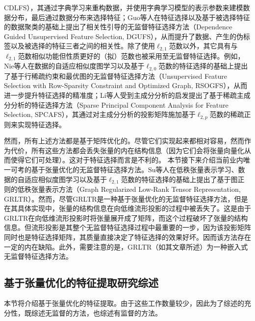 CDLFS），其通过字典学习来重构数据，并使用字典学习模型的表示参数来建模数据分布，最后通过数据分布来选择特征；Guo等人在特征选择以及基于被选择特征的数据聚类的基础上提出了相关性引导的无监督特征选择方法（Dependence Guided Unsupervised Feature Selection, DGUFS），从而提升了数据、产生的伪标签以及被选择的特征三者之间的相关性。除了使用$\ell_{2,1}$范数以外，其它具有与$\ell_{2,1}$范数相似功能但性质更好的（拟）范数也被采用至无监督特征选择。例如，Nie等人在数据的自适应相似度图学习以及基于$\ell_{2,0}$范数的特征选择的基础上提出了基于行稀疏约束和最优图的无监督特征选择方法（Unsupervised Feature Selection with Row-Sparsity Constraint and Optimized Graph, RSOGFS），从而进一步提升特征选择的精准度；Li等人受到主成分分析的启发提出了基于稀疏主成分分析的特征选择方法（Sparse Principal Component Analysis for Feature Selection, SPCAFS），其通过对主成分分析的投影矩阵施加基于$\ell_{2,p}$范数的稀疏正则来实现特征选择。

然而，所有上述方法都是基于矩阵优化的。尽管它们实现起来都相对容易，然而作为代价，所有这些方法都会丢失张量的内在结构信息（因为它们会将张量向量化从而使得它们可处理）。这对于特征选择而言是不利的。
本节接下来介绍当前业内唯一可考的基于张量优化的无监督特征选择方法。Su等人在低秩张量表示学习、数据的自适应相似度图学习以及基于$\ell_{2,1}$范数的特征选择的基础上提出了基于图正则的低秩张量表示方法（Graph Regularized Low-Rank Tensor Representation, GRLTR）。然而，尽管GRLTR是一种基于张量优化的无监督特征选择方法，但是在其具体实现中，张量的结构信息在向低维流形投影的过程中被丢失了。这是由于GRLTR在向低维流形投影时将张量展开成了矩阵，而这个过程破坏了张量的结构信息。但流形投影是其整个无监督特征选择过程中最重要的一步，因为该投影矩阵同时也是特征选择矩阵，其质量直接决定了特征选择的效果好坏。因而该方法存在一定的内在缺陷。此外，需要注意的是，GRLTR（如其文章所述）为一种嵌入式无监督特征选择方法。


\subsection{基于张量优化的特征提取研究综述}\label{sec:review-ufe}
本节将介绍基于张量优化的特征提取。由于这些工作数量较少，因此为了综述的充分性，既综述无监督的方法，也综述有监督的方法。


